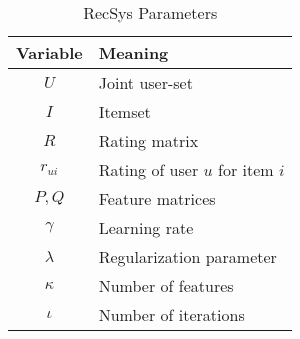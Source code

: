 \documentclass[USenglish,oneside,twocolumn]{article}
\theoremstyle{plain}
\begin{document}
    \vspace{-0.25cm}
    \begin{table}[h]
        \centering
        \begin{tabular}{|c|l|}
            \hline
            \bf{Variable} & \bf{Meaning}\\
            \hline
            $U$ & Joint user-set\\
            \hline
            $I$ & Itemset\\
            \hline
            $R$ & Rating matrix\\
            \hline
            $r_{ui}$ & Rating of user $u$ for item $i$\\
            \hline
            $P,Q$ & Feature matrices\\
            \hline
            $\gamma$ & Learning rate\\
            \hline
            $\lambda$ & Regularization parameter\\
            \hline
            $\kappa$ & Number of features\\
            \hline
            $\iota$ & Number of iterations\\
            \hline
        \end{tabular}
        \vspace{0.1cm}
        \caption{RecSys Parameters}
        \label{tab:sum}
    \end{table}
    \vspace{-1cm}
    
    
    
    
\end{document}
